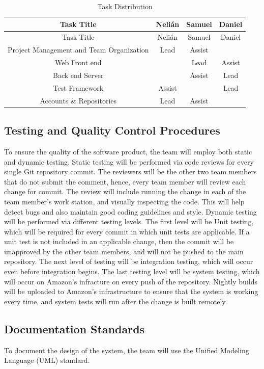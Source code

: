 \setlength{\extrarowheight}{1.5pt}
  \begin{longtable}{|c|c|c|c|}
 \caption{Task Distribution \label{tasks}} \\
   \hline
  
  \centering Task Title & Nelián & Samuel & Daniel \\
  \hline \hline \endfirsthead
  
     \hline

	\centering Task Title & Nelián & Samuel & Daniel \\  
	\hline \hline \endhead
  
  \endfoot  
  
  Project Management and Team Organization & Lead & Assist & \\ \hline
  Web Front end & & Lead & Assist \\ \hline
  Back end Server & & Assist & Lead \\ \hline
  Test Framework & Assist & & Lead \\ \hline
  Accounts \& Repositories & Lead & Assist &\\ \hline
   \end{longtable}
\subsection{Testing and Quality Control Procedures}

To ensure the quality of the software product, the team will employ both static
and dynamic testing. Static testing will be performed via code reviews for every
single Git repository commit. The reviewers will be the other two team members
that do not submit the comment, hence, every team member will review each change
for commit. The review will include running the change in each of the team
member's work station, and visually inspecting the code. This will help detect
bugs and also maintain good coding guidelines and style. Dynamic testing will be
performed via different testing levels. The first level will be Unit testing,
which will be required for every commit in which unit tests are applicable. If a
unit test is not included in an applicable change, then the commit will be
unapproved by the other team members, and will not be pushed to the main
repository. The next level of testing will be integration testing, which will
occur even before integration begins. The last testing level will be system
testing, which will occur on Amazon's infracture on every push of the
repository. Nightly builds will be uploaded to Amazon's infrastructure to ensure
that the system is working every time, and system tests will run after the
change is built remotely.

\subsection{Documentation Standards}
To document the design of the system, the team will use the Unified Modeling Language (UML) standard.